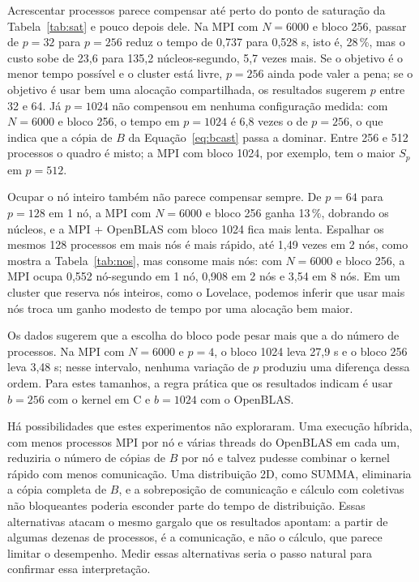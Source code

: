 \documentclass[Portugues]{ic-tese-v3}
\DeclareRobustCommand{\_}{\textunderscore\allowbreak} %
\begin{document}
Acrescentar processos parece compensar até perto do ponto de saturação da Tabela~\ref{tab:sat} e pouco depois dele. Na MPI com $N=6000$ e bloco 256, passar de $p=32$ para $p=256$ reduz o tempo de 0,737 para 0,528 s, isto é, 28\,\%, mas o custo sobe de 23,6 para 135,2 núcleos-segundo, 5,7 vezes mais. Se o objetivo é o menor tempo possível e o cluster está livre, $p=256$ ainda pode valer a pena; se o objetivo é usar bem uma alocação compartilhada, os resultados sugerem $p$ entre 32 e 64. Já $p=1024$ não compensou em nenhuma configuração medida: com $N=6000$ e bloco 256, o tempo em $p=1024$ é 6,8 vezes o de $p=256$, o que indica que a cópia de $B$ da Equação~\eqref{eq:bcast} passa a dominar. Entre 256 e 512 processos o quadro é misto; a MPI com bloco 1024, por exemplo, tem o maior $S_p$ em $p=512$.

Ocupar o nó inteiro também não parece compensar sempre. De $p=64$ para $p=128$ em 1 nó, a MPI com $N=6000$ e bloco 256 ganha 13\,\%, dobrando os núcleos, e a MPI + OpenBLAS com bloco 1024 fica mais lenta. Espalhar os mesmos 128 processos em mais nós é mais rápido, até 1,49 vezes em 2 nós, como mostra a Tabela~\ref{tab:nos}, mas consome mais nós: com $N=6000$ e bloco 256, a MPI ocupa 0,552 nó-segundo em 1 nó, 0,908 em 2 nós e 3,54 em 8 nós. Em um cluster que reserva nós inteiros, como o Lovelace, podemos inferir que usar mais nós troca um ganho modesto de tempo por uma alocação bem maior.

Os dados sugerem que a escolha do bloco pode pesar mais que a do número de processos. Na MPI com $N=6000$ e $p=4$, o bloco 1024 leva 27,9 s e o bloco 256 leva 3,48 s; nesse intervalo, nenhuma variação de $p$ produziu uma diferença dessa ordem. Para estes tamanhos, a regra prática que os resultados indicam é usar $b=256$ com o kernel em C e $b=1024$ com o OpenBLAS.

Há possibilidades que estes experimentos não exploraram. Uma execução híbrida, com menos processos MPI por nó e várias threads do OpenBLAS em cada um, reduziria o número de cópias de $B$ por nó e talvez pudesse combinar o kernel rápido com menos comunicação. Uma distribuição 2D, como SUMMA, eliminaria a cópia completa de $B$, e a sobreposição de comunicação e cálculo com coletivas não bloqueantes poderia esconder parte do tempo de distribuição. Essas alternativas atacam o mesmo gargalo que os resultados apontam: a partir de algumas dezenas de processos, é a comunicação, e não o cálculo, que parece limitar o desempenho. Medir essas alternativas seria o passo natural para confirmar essa interpretação.
\end{document}
